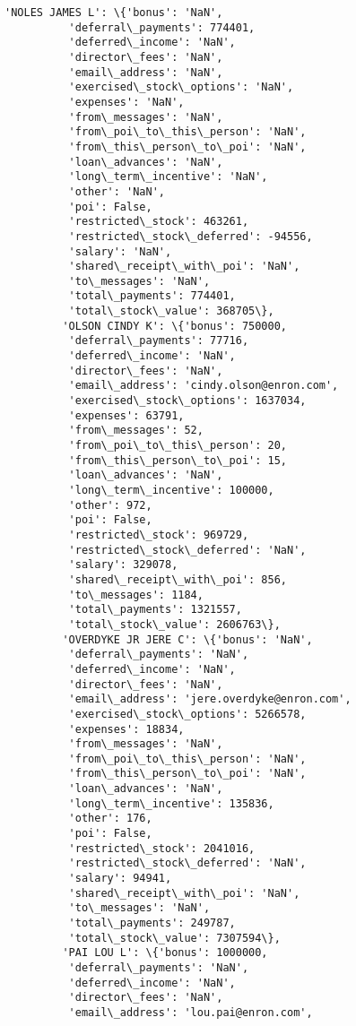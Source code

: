 \documentclass[11pt]{article}
\begin{document}
\begin{Verbatim}[commandchars=\\\{\}]
         'NOLES JAMES L': \{'bonus': 'NaN',
          'deferral\_payments': 774401,
          'deferred\_income': 'NaN',
          'director\_fees': 'NaN',
          'email\_address': 'NaN',
          'exercised\_stock\_options': 'NaN',
          'expenses': 'NaN',
          'from\_messages': 'NaN',
          'from\_poi\_to\_this\_person': 'NaN',
          'from\_this\_person\_to\_poi': 'NaN',
          'loan\_advances': 'NaN',
          'long\_term\_incentive': 'NaN',
          'other': 'NaN',
          'poi': False,
          'restricted\_stock': 463261,
          'restricted\_stock\_deferred': -94556,
          'salary': 'NaN',
          'shared\_receipt\_with\_poi': 'NaN',
          'to\_messages': 'NaN',
          'total\_payments': 774401,
          'total\_stock\_value': 368705\},
         'OLSON CINDY K': \{'bonus': 750000,
          'deferral\_payments': 77716,
          'deferred\_income': 'NaN',
          'director\_fees': 'NaN',
          'email\_address': 'cindy.olson@enron.com',
          'exercised\_stock\_options': 1637034,
          'expenses': 63791,
          'from\_messages': 52,
          'from\_poi\_to\_this\_person': 20,
          'from\_this\_person\_to\_poi': 15,
          'loan\_advances': 'NaN',
          'long\_term\_incentive': 100000,
          'other': 972,
          'poi': False,
          'restricted\_stock': 969729,
          'restricted\_stock\_deferred': 'NaN',
          'salary': 329078,
          'shared\_receipt\_with\_poi': 856,
          'to\_messages': 1184,
          'total\_payments': 1321557,
          'total\_stock\_value': 2606763\},
         'OVERDYKE JR JERE C': \{'bonus': 'NaN',
          'deferral\_payments': 'NaN',
          'deferred\_income': 'NaN',
          'director\_fees': 'NaN',
          'email\_address': 'jere.overdyke@enron.com',
          'exercised\_stock\_options': 5266578,
          'expenses': 18834,
          'from\_messages': 'NaN',
          'from\_poi\_to\_this\_person': 'NaN',
          'from\_this\_person\_to\_poi': 'NaN',
          'loan\_advances': 'NaN',
          'long\_term\_incentive': 135836,
          'other': 176,
          'poi': False,
          'restricted\_stock': 2041016,
          'restricted\_stock\_deferred': 'NaN',
          'salary': 94941,
          'shared\_receipt\_with\_poi': 'NaN',
          'to\_messages': 'NaN',
          'total\_payments': 249787,
          'total\_stock\_value': 7307594\},
         'PAI LOU L': \{'bonus': 1000000,
          'deferral\_payments': 'NaN',
          'deferred\_income': 'NaN',
          'director\_fees': 'NaN',
          'email\_address': 'lou.pai@enron.com',

\end{Verbatim}
\end{document}
